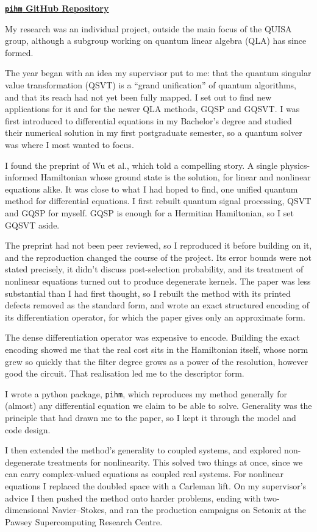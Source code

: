 \noindent\href{\pihmrepo}{\textbf{\texttt{pihm} GitHub Repository}}\par\smallskip

My research was an individual project, outside the main focus of the QUISA group, although a subgroup working on quantum linear algebra (QLA) has since formed.

The year began with an idea my supervisor put to me: that the quantum singular value transformation (QSVT) is a ``grand unification'' of quantum algorithms, and that its reach had not yet been fully mapped. I set out to find new applications for it and for the newer QLA methods, GQSP and GQSVT. I was first introduced to differential equations in my Bachelor's degree and studied their numerical solution in my first postgraduate semester, so a quantum solver was where I most wanted to focus.

I found the preprint of Wu et al., which told a compelling story. A single physics-informed Hamiltonian whose ground state is the solution, for linear and nonlinear equations alike. It was close to what I had hoped to find, one unified quantum method for differential equations. I first rebuilt quantum signal processing, QSVT and GQSP for myself. GQSP is enough for a Hermitian Hamiltonian, so I set GQSVT aside.

The preprint had not been peer reviewed, so I reproduced it before building on it, and the reproduction changed the course of the project. Its error bounds were not stated precisely, it didn't discuss post-selection probability, and its treatment of nonlinear equations turned out to produce degenerate kernels. The paper was less substantial than I had first thought, so I rebuilt the method with its printed defects removed as the standard form, and wrote an exact structured encoding of its differentiation operator, for which the paper gives only an approximate form.

The dense differentiation operator was expensive to encode. Building the exact encoding showed me that the real cost sits in the Hamiltonian itself, whose norm grew so quickly that the filter degree grows as a power of the resolution, however good the circuit. That realisation led me to the descriptor form.

I wrote a python package, \texttt{pihm}, which reproduces my method generally for (almost) any differential equation we claim to be able to solve. Generality was the principle that had drawn me to the paper, so I kept it through the model and code design.

I then extended the method's generality to coupled systems, and explored non-degenerate treatments for nonlinearity. This solved two things at once, since we can carry complex-valued equations as coupled real systems. For nonlinear equations I replaced the doubled space with a Carleman lift. On my supervisor's advice I then pushed the method onto harder problems, ending with two-dimensional Navier--Stokes, and ran the production campaigns on Setonix at the Pawsey Supercomputing Research Centre.
